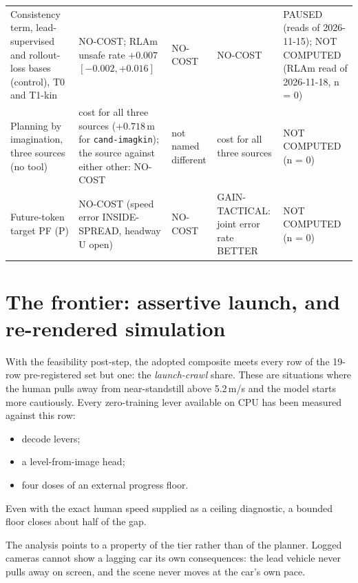 \documentclass[10pt,twocolumn]{article}
\theoremstyle{remark}
\newcommand{\tier}[1]{\textsc{\small #1}}
\begin{document}
\begin{table}[!tp]
\begin{tabularx}{\textwidth}{@{}>{\raggedright\arraybackslash}p{33mm}>{\raggedright\arraybackslash}X>{\raggedright\arraybackslash}X>{\raggedright\arraybackslash}X>{\raggedright\arraybackslash}p{19mm}@{}}
Consistency term, lead-supervised and rollout-loss bases (control), \tier{T0} and T1-kin & NO-COST; RLAm unsafe rate $+0.007$ $[-0.002,+0.016]$ & NO-COST & NO-COST & PAUSED (reads of 2026-11-15); NOT COMPUTED (RLAm read of 2026-11-18, n = 0) \\
Planning by imagination, three sources (no tool) & cost for all three sources ($+0.718$\,m for \texttt{cand-imagkin}); the source against either other: NO-COST & not named different & cost for all three sources & NOT COMPUTED (n = 0) \\
Future-token target PF (P) & NO-COST (speed error INSIDE-SPREAD, headway U open) & NO-COST & GAIN-TACTICAL: joint error rate BETTER & NOT COMPUTED (n = 0) \\
\bottomrule
\end{tabularx}
\end{table}


\section{The frontier: assertive launch, and re-rendered simulation}\label{sec:frontier}
With the feasibility post-step, the adopted composite meets every row of the 19-row pre-registered set but one: the \emph{launch-crawl}
share. These are situations where the human pulls away from near-standstill above 5.2\,m/s and the model starts more cautiously.
Every zero-training lever available on CPU has been measured against this row:
\begin{itemize}
  \item decode levers;
  \item a level-from-image head;
  \item four doses of an external progress floor.
\end{itemize}
Even with the exact human speed supplied as a ceiling diagnostic, a bounded floor closes about half of the gap.

The analysis points to a property of the tier rather than of the planner. Logged cameras cannot show a lagging car its own
consequences: the lead vehicle never pulls away on screen, and the scene never moves at the car's own pace.
\end{document}
